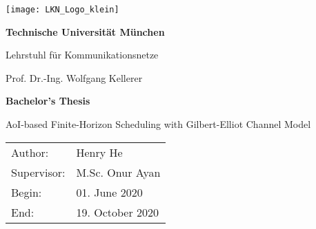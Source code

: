 \thispagestyle{empty}
\newpage

\vspace{5cm}
  \begin{center}
        \texttt{[image: LKN\_Logo\_klein]}
  \end{center}

\begin{center} {\sf\bf 
                               \Large  Technische Universität München
                                \smallskip

                               \Large Lehrstuhl für Kommunikationsnetze
                               \smallskip
                              }

                              {\sf \large Prof. Dr.-Ing. Wolfgang Kellerer} 
\end{center}  

\vspace{4cm}

\begin{center}
        {\bf\Huge Bachelor's Thesis} %
\end{center}

\begin{center}
        \settowidth{\baselineskip}{0.4cm}
        {\LARGE 
        AoI-based Finite-Horizon Scheduling with Gilbert-Elliot Channel Model
        }
\end{center}

\vfill         
{\settowidth{\baselineskip}{0.2cm}
\large\begin{tabular}[l]{ll}
Author: & Henry He\\
Supervisor: & M.Sc. Onur Ayan\\
Begin: & 01. June 2020\\
End: & 19. October 2020
\end{tabular}}

